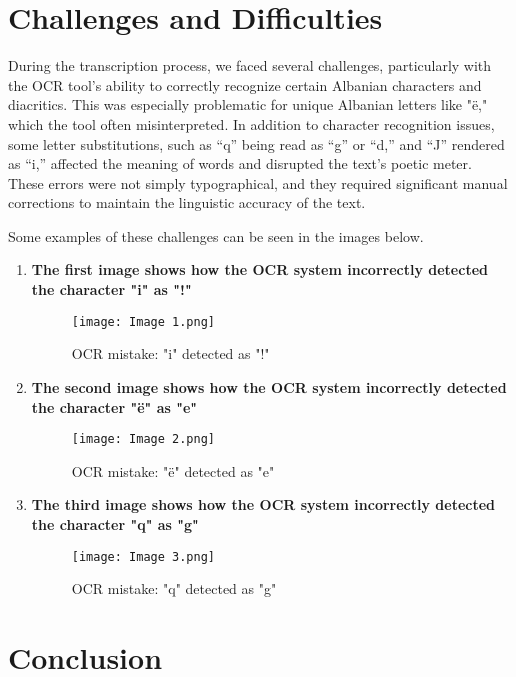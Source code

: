 \documentclass[12pt]{article}
\begin{document}
\section*{Challenges and Difficulties}
During the transcription process, we faced several challenges, particularly with the OCR tool’s ability to correctly recognize certain Albanian characters and diacritics. This was especially problematic for unique Albanian letters like "ë," which the tool often misinterpreted. In addition to character recognition issues, some letter substitutions, such as “q” being read as “g” or “d,” and “J” rendered as “i,” affected the meaning of words and disrupted the text’s poetic meter. These errors were not simply typographical, and they required significant manual corrections to maintain the linguistic accuracy of the text.

    \vspace{1em}
Some examples of these challenges can be seen in the images below.

\begin{enumerate}
    \item \textbf{The first image shows how the OCR system incorrectly detected the character "i" as "!"}
    \begin{figure}[h!]
        \centering
        \texttt{[image: Image 1.png]}
        \caption{OCR mistake: "i" detected as "!"}
        \label{fig:ocr_mistake1}
    \end{figure}

    \item \textbf{The second image shows how the OCR system incorrectly detected the character "ë" as "e"}
    \begin{figure}[h!]
        \centering
        \texttt{[image: Image 2.png]}
        \caption{OCR mistake: "ë" detected as "e"}
        \label{fig:ocr_mistake2}
    \end{figure}

    \item \textbf{The third image shows how the OCR system incorrectly detected the character "q" as "g"}
    \begin{figure}[h!]
        \centering
        \texttt{[image: Image 3.png]}
        \caption{OCR mistake: "q" detected as "g"}
        \label{fig:ocr_mistake3}
    \end{figure}
\end{enumerate}

\section*{Conclusion}
\end{document}
